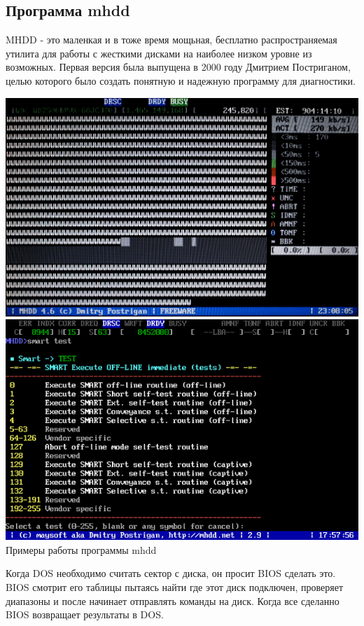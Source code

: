 \documentclass[a4paper,14pt]{extarticle}
\begin{document}
\subsection{Программа mhdd}
MHDD\cite{real-world-systems} - это маленкая и в тоже время мощьная, бесплатно распространяемая утилита для работы с жесткими дисками на наиболее низком уровне из возможных. Первая версия была выпущена в 2000 году Дмитрием Постриганом, целью которого было создать понятную и надежную программу для диагностики. 
\begin{center}
	\includegraphics[scale=0.3]{img/mhdd1.png}\\
	\vspace{0.25cm}
	\includegraphics[scale=0.81]{img/mhdd2.png}\\
	Примеры работы программы mhdd
\end{center}

Когда DOS необходимо считать сектор с диска, он просит BIOS сделать это. BIOS смотрит его таблицы пытаясь найти где этот диск подключен, проверяет диапазоны и после начинает отправлять команды на диск. Когда все сделанно BIOS возвращает результаты в DOS.\\
\end{document}

